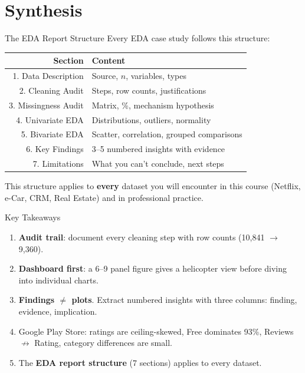 \documentclass[10pt]{beamer}
\begin{document}
\section{Synthesis}

\begin{frame}{The EDA Report Structure}
  Every EDA case study follows this structure:
  \centering
  \begin{tabular}{rl}
    \toprule
    \textbf{Section} & \textbf{Content} \\
    \midrule
    1. Data Description & Source, $n$, variables, types \\
    2. Cleaning Audit & Steps, row counts, justifications \\
    3. Missingness Audit & Matrix, \%, mechanism hypothesis \\
    4. Univariate EDA & Distributions, outliers, normality \\
    5. Bivariate EDA & Scatter, correlation, grouped comparisons \\
    6. Key Findings & 3--5 numbered insights with evidence \\
    7. Limitations & What you can't conclude, next steps \\
    \bottomrule
  \end{tabular}
  \vspace{6pt}
  {\small This structure applies to \textbf{every} dataset you will
  encounter in this course (Netflix, e-Car, CRM, Real Estate) and
  in professional practice.}
\end{frame}

\begin{frame}{Key Takeaways}
  \begin{enumerate}
    \item \textbf{Audit trail}: document every cleaning step with row
          counts (10,841 $\rightarrow$ 9,360).
    \item \textbf{Dashboard first}: a 6--9 panel figure gives a
          helicopter view before diving into individual charts.
    \item \textbf{Findings $\neq$ plots}. Extract numbered insights
          with three columns: finding, evidence, implication.
    \item Google Play Store: ratings are ceiling-skewed, Free dominates
          93\%, Reviews $\not\rightarrow$ Rating, category differences
          are small.
    \item The \textbf{EDA report structure} (7 sections) applies to
          every dataset.
  \end{enumerate}
\end{frame}
\end{document}
